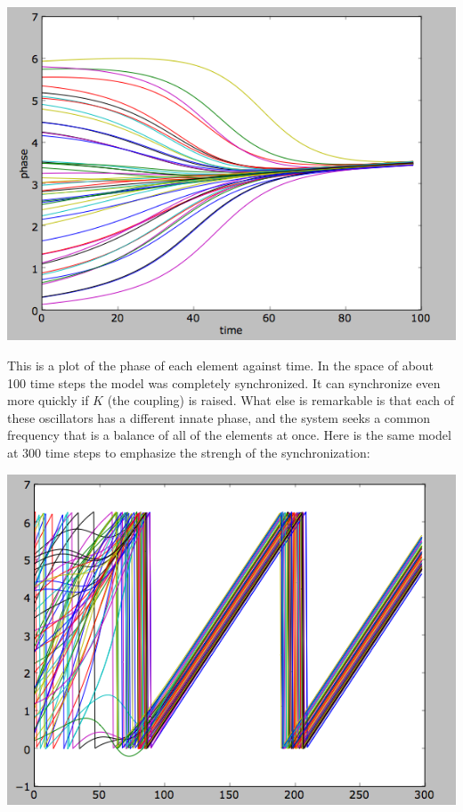 \documentclass[12pt]{article}
\begin{document}
\vspace{15pt}
\includegraphics[scale=0.67]{kuramoto.png}
\vspace{5pt}

This is a plot of the phase of each element against time.  In the space of about 100 time steps the model was completely synchronized.  It can synchronize even more quickly if $K$ (the coupling) is raised.  What else is remarkable is that each of these oscillators has a different innate phase, and the system seeks a common frequency that is a balance of all of the elements at once.  Here is the same model at 300 time steps to emphasize the strengh of the synchronization:

\includegraphics[scale=0.67]{synchronization.png}
\end{document}
